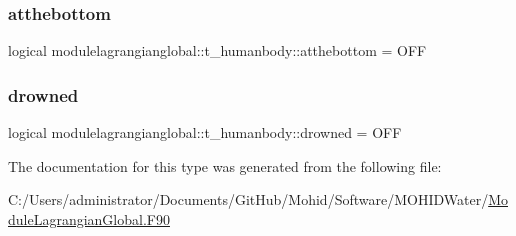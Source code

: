 \subsubsection{\texorpdfstring{atthebottom}{atthebottom}}
{\footnotesize\ttfamily logical modulelagrangianglobal\+::t\+\_\+humanbody\+::atthebottom = O\+FF\hspace{0.3cm}{\ttfamily [private]}}

\mbox{\label{structmodulelagrangianglobal_1_1t__humanbody_ad9b628045d9171ef0fb185ee33cfd5ef}} 
\subsubsection{\texorpdfstring{drowned}{drowned}}
{\footnotesize\ttfamily logical modulelagrangianglobal\+::t\+\_\+humanbody\+::drowned = O\+FF\hspace{0.3cm}{\ttfamily [private]}}



The documentation for this type was generated from the following file\+:\begin{DoxyCompactItemize}
\item 
C\+:/\+Users/administrator/\+Documents/\+Git\+Hub/\+Mohid/\+Software/\+M\+O\+H\+I\+D\+Water/\mbox{\hyperlink{_module_lagrangian_global_8_f90}{Module\+Lagrangian\+Global.\+F90}}\end{DoxyCompactItemize}
